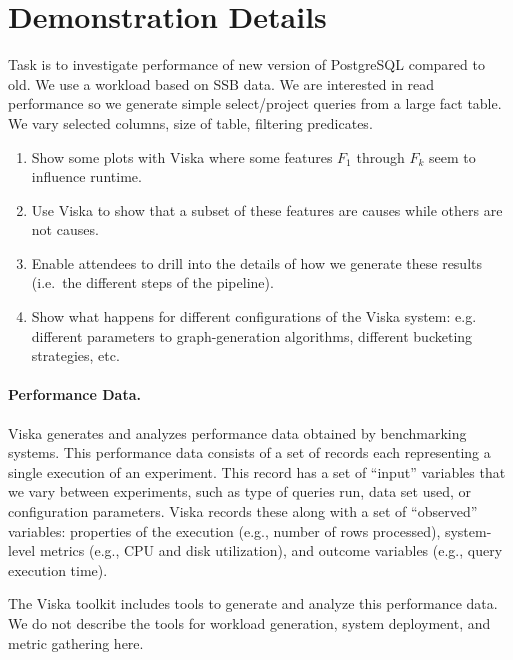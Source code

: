 \section{Demonstration Details}

Task is to investigate performance of new version of PostgreSQL compared to
old. We use a workload based on SSB data. We are interested in read performance
so we generate simple select/project queries from a large fact table. We vary
selected columns, size of table, filtering predicates.

\begin{enumerate}
\item Show some plots with Viska where some features $F_1$ through $F_k$ seem to
influence runtime.
\item Use Viska to show that a subset of these features are causes while others
are not causes.
\item Enable attendees to drill into the details of how we generate these
results (i.e.\, the different steps of the pipeline).
\item Show what happens for different configurations of the Viska system:
e.g.\, different parameters to graph-generation algorithms, different bucketing
strategies, etc.
\end{enumerate}

\paragraph{Performance Data.}

Viska generates and analyzes performance data obtained by benchmarking
systems. This performance data consists of a set of records
each representing a single execution of an experiment. This record has
a set of ``input'' variables that we vary between experiments, such as
type of queries run, data set used, or configuration parameters. Viska
records these along with a set of ``observed'' variables: properties
of the execution (e.g., number of rows processed), system-level
metrics (e.g., CPU and disk utilization), and outcome variables (e.g.,
query execution time).

The Viska toolkit includes tools to generate and analyze this
performance data. We do not describe the tools for workload
generation, system deployment, and metric gathering here.


